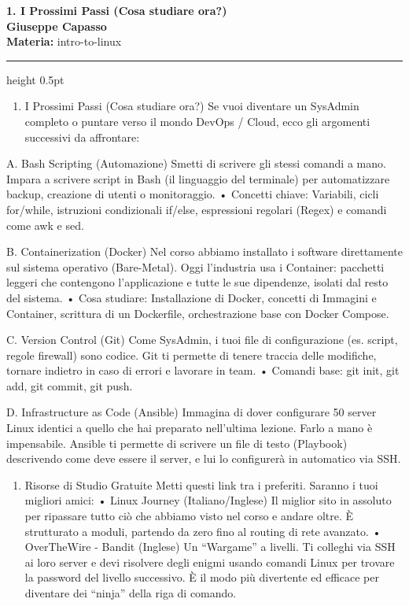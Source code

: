 \documentclass[11pt,a4paper]{article}
\providecommand{\tightlist}{%
  \setlength{\itemsep}{0pt}\setlength{\parskip}{0pt}}
\newcommand{\proposaltitle}[1]{
    \begin{center}
        \vspace*{0.1cm}
        {\LARGE \bfseries \color{blue} #1} \\[1.5ex]
        {\large \textbf{Giuseppe Capasso}} \\[1ex]
                \small{
            \vspace{0.1cm}
            \textbf{Materia:} intro-to-linux\\
        }
            \end{center}
    \vspace{0.3cm}
    \hrule height 0.5pt
    \vspace{0.5cm}
}
\begin{document}
\proposaltitle{1. I Prossimi Passi (Cosa studiare ora?)}

\begin{enumerate}
\def\labelenumi{\arabic{enumi}.}
\tightlist
\item
  I Prossimi Passi (Cosa studiare ora?) Se vuoi diventare un SysAdmin
  completo o puntare verso il mondo DevOps / Cloud, ecco gli argomenti
  successivi da affrontare:
\end{enumerate}

A. Bash Scripting (Automazione) Smetti di scrivere gli stessi comandi a
mano. Impara a scrivere script in Bash (il linguaggio del terminale) per
automatizzare backup, creazione di utenti o monitoraggio. • Concetti
chiave: Variabili, cicli for/while, istruzioni condizionali if/else,
espressioni regolari (Regex) e comandi come awk e sed.

B. Containerization (Docker) Nel corso abbiamo installato i software
direttamente sul sistema operativo (Bare-Metal). Oggi l'industria usa i
Container: pacchetti leggeri che contengono l'applicazione e tutte le
sue dipendenze, isolati dal resto del sistema. • Cosa studiare:
Installazione di Docker, concetti di Immagini e Container, scrittura di
un Dockerfile, orchestrazione base con Docker Compose.

C. Version Control (Git) Come SysAdmin, i tuoi file di configurazione
(es. script, regole firewall) sono codice. Git ti permette di tenere
traccia delle modifiche, tornare indietro in caso di errori e lavorare
in team. • Comandi base: git init, git add, git commit, git push.

D. Infrastructure as Code (Ansible) Immagina di dover configurare 50
server Linux identici a quello che hai preparato nell'ultima lezione.
Farlo a mano è impensabile. Ansible ti permette di scrivere un file di
testo (Playbook) descrivendo come deve essere il server, e lui lo
configurerà in automatico via SSH.

\begin{enumerate}
\def\labelenumi{\arabic{enumi}.}
\setcounter{enumi}{1}
\tightlist
\item
  Risorse di Studio Gratuite Metti questi link tra i preferiti. Saranno
  i tuoi migliori amici: • Linux Journey (Italiano/Inglese) Il miglior
  sito in assoluto per ripassare tutto ciò che abbiamo visto nel corso e
  andare oltre. È strutturato a moduli, partendo da zero fino al routing
  di rete avanzato. • OverTheWire - Bandit (Inglese) Un ``Wargame'' a
  livelli. Ti colleghi via SSH ai loro server e devi risolvere degli
  enigmi usando comandi Linux per trovare la password del livello
  successivo. È il modo più divertente ed efficace per diventare dei
  ``ninja'' della riga di comando.
\end{enumerate}
\end{document}
